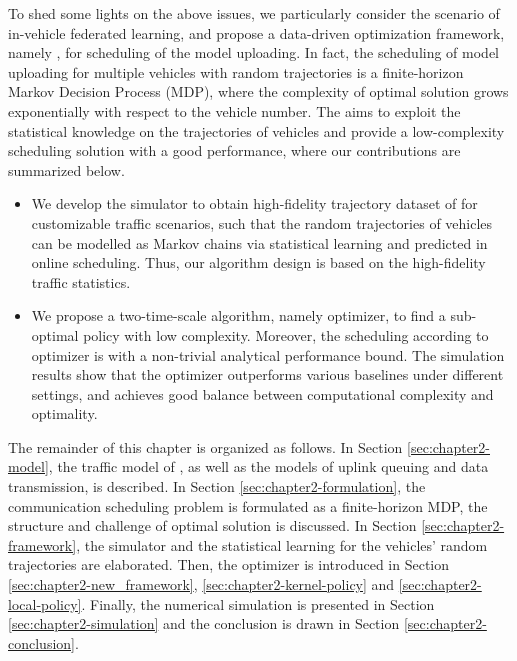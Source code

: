 To shed some lights on the above issues, we particularly consider the scenario of in-vehicle federated learning, and  propose a data-driven optimization framework, namely {\fwName}, for scheduling of the model uploading. In fact, the scheduling of model uploading for multiple vehicles with random trajectories is a finite-horizon Markov Decision Process (MDP), where the complexity of optimal solution grows exponentially with respect to the vehicle number. The {\fwName} aims to exploit the statistical knowledge on the trajectories of vehicles and provide a low-complexity scheduling solution with a good performance, where our contributions are summarized below.
\begin{itemize}
    \item We develop the {\fwName} simulator to obtain high-fidelity trajectory dataset of {\IAVs} for customizable traffic scenarios, such that the random trajectories of vehicles can be modelled as Markov chains via statistical learning and predicted in online scheduling. Thus, our algorithm design is based on the high-fidelity traffic statistics.
    \item We propose a two-time-scale algorithm, namely {\fwName} optimizer, to find a sub-optimal policy with low complexity. Moreover, the scheduling according to {\fwName} optimizer is with a non-trivial analytical performance bound. The simulation results show that the {\fwName} optimizer outperforms various baselines under different settings, and achieves good balance between computational complexity and optimality.
\end{itemize}

The remainder of this chapter is organized as follows.
In Section \ref{sec:chapter2-model}, the traffic model of {\IAVs}, as well as the models of uplink queuing and data transmission, is described.
In Section \ref{sec:chapter2-formulation}, the communication scheduling problem is formulated as a finite-horizon MDP, the structure and challenge of optimal solution is discussed.
In Section \ref{sec:chapter2-framework}, the {\fwName} simulator and the statistical learning for the vehicles' random trajectories are elaborated.
Then, the {\fwName} optimizer is introduced in Section \ref{sec:chapter2-new_framework}, \ref{sec:chapter2-kernel-policy} and \ref{sec:chapter2-local-policy}.
Finally, the numerical simulation is presented in Section \ref{sec:chapter2-simulation} and the conclusion is drawn in Section \ref{sec:chapter2-conclusion}.



